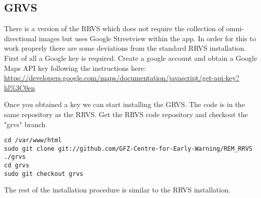 \documentclass{article}
\begin{document}
\subsection{GRVS}
There is a version of the RRVS which does not require the
collection of omni-directional images but uses Google Streetview
within the app. In order for this to work properly there
are some deviations from the standard RRVS installation.
First of all a Google key is required.
Create a google account and obtain a Google Maps API key
following the instructions here:
\url{https://developers.google.com/maps/documentation/javascript/get-api-key?hl%3C0en}

Once you obtained a key we can start installing the GRVS.
The code is in the same repository as the RRVS.
Get the RRVS code repository and checkout the "grvs" branch 

\begin{verbatim}
cd /var/www/html
sudo git clone git://github.com/GFZ-Centre-for-Early-Warning/REM_RRVS ./grvs
cd grvs
sudo git checkout grvs
\end{verbatim}

The rest of the installation procedure is similar to the RRVS 
installation. 
\end{document}
